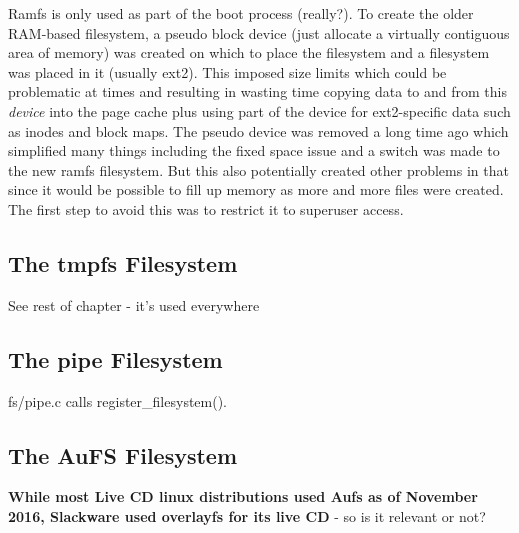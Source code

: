 Ramfs is only used as part of the boot process (really?). To create the older RAM-based filesystem,  a pseudo block device (just allocate a virtually contiguous area of memory) was created on which to place the filesystem and a filesystem was placed in it (usually ext2). This imposed size limits which could be problematic at times and resulting in wasting time copying data to and from this \textit{device} into the page cache plus using part of the device for ext2-specific data such as inodes and block maps. The pseudo device was removed a long time ago which simplified many things including the fixed space issue and a switch was made to the new ramfs filesystem. But this also potentially created other problems in that since it would be possible to fill up memory as more and more files were created. The first step to avoid this was to restrict it to superuser access. 


\subsection{The tmpfs Filesystem}


See rest of chapter - it's used everywhere


\subsection{The pipe Filesystem}\label{pipefs}

fs/pipe.c calls register\_filesystem().


\subsection{The AuFS Filesystem}

\textbf{While most Live CD linux distributions used Aufs as of November 2016, Slackware used overlayfs for its live CD} - so is it relevant or not?

